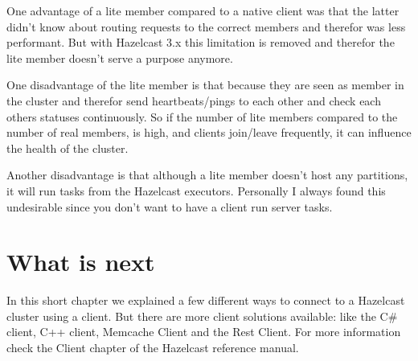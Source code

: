 One advantage of a lite member compared to a native client was that the latter didn't know about routing requests to the correct members and therefor was less performant. But with Hazelcast 3.x this limitation is removed and therefor the lite member doesn't serve a purpose anymore.

One disadvantage of the lite member is that because they are seen as member in the cluster and therefor send heartbeats/pings to each other and check each others statuses continuously. So if the number of lite members compared to the number of real members, is high, and clients join/leave frequently, it can influence the health of the cluster. 

Another disadvantage is that although a lite member doesn't host any partitions, it will run tasks from the Hazelcast executors. Personally I always found this undesirable since you don't want to have a client run server tasks.

\section{What is next}
In this short chapter we explained a few different ways to connect to a Hazelcast cluster using a client. But there are more client solutions available: like the C\# client, C++ client, Memcache Client and the Rest Client. For more information check the Client chapter of the Hazelcast reference manual.